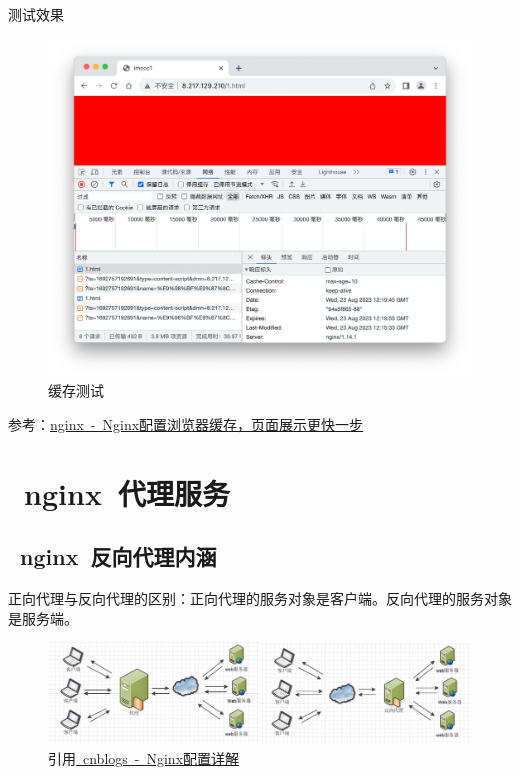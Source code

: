 \documentclass[12pt, a4paper]{article} %
\renewcommand{\figurename}{图} %
\begin{document}
\begin{CJK*}{UTF8}{gbsn}
测试效果
\renewcommand{\figurename}{图} %
\begin{figure}[htbp]
    \centering
    \includegraphics[width=1\textwidth]{./imgs/catch2023-08-23-20.21.19.png}
    \caption{缓存测试}
\end{figure}

参考：\href{https://blog.csdn.net/weixin_43834401/article/details/130599930}{nginx~-~Nginx配置浏览器缓存，页面展示更快一步}


\clearpage
\section{~nginx~代理服务}

\subsection{~nginx~反向代理内涵}
正向代理与反向代理的区别：正向代理的服务对象是客户端。反向代理的服务对象是服务端。

\renewcommand{\figurename}{图} %
\begin{figure}[htbp]
    \centering
    \includegraphics[width=1\textwidth]{./imgs/20160202133724350.jpg}
    \caption{引用\href{https://www.cnblogs.com/knowledgesea/p/5175711.html}{~cnblogs~-~Nginx配置详解}}
\end{figure}


\end{CJK*}
\end{document}
